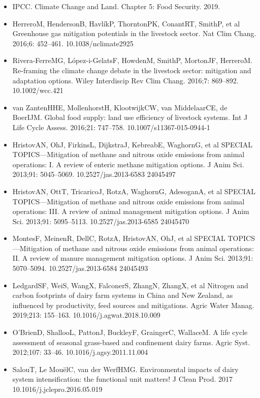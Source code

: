 \documentclass[11pt,a4paper]{article}
\begin{document}
\begin{itemize}
\item IPCC. Climate Change and Land. Chapter 5: Food Security. 2019.
\item HerreroM, HendersonB, HavlíkP, ThorntonPK, ConantRT, SmithP, et al Greenhouse gas mitigation potentials in the livestock sector. Nat Clim Chang. 2016;6: 452–461. 10.1038/nclimate2925
\item Rivera-FerreMG, López-i-GelatsF, HowdenM, SmithP, MortonJF, HerreroM. Re-framing the climate change debate in the livestock sector: mitigation and adaptation options. Wiley Interdiscip Rev Clim Chang. 2016;7: 869–892. 10.1002/wcc.421
\item van ZantenHHE, MollenhorstH, KlootwijkCW, van MiddelaarCE, de BoerIJM. Global food supply: land use efficiency of livestock systems. Int J Life Cycle Assess. 2016;21: 747–758. 10.1007/s11367-015-0944-1
\item HristovAN, OhJ, FirkinsL, DijkstraJ, KebreabE, WaghornG, et al SPECIAL TOPICS—Mitigation of methane and nitrous oxide emissions from animal operations: I. A review of enteric methane mitigation options. J Anim Sci. 2013;91: 5045–5069. 10.2527/jas.2013-6583 24045497
\item HristovAN, OttT, TricaricoJ, RotzA, WaghornG, AdesoganA, et al SPECIAL TOPICS—Mitigation of methane and nitrous oxide emissions from animal operations: III. A review of animal management mitigation options. J Anim Sci. 2013;91: 5095–5113. 10.2527/jas.2013-6585 24045470
\item MontesF, MeinenR, DellC, RotzA, HristovAN, OhJ, et al SPECIAL TOPICS—Mitigation of methane and nitrous oxide emissions from animal operations: II. A review of manure management mitigation options. J Anim Sci. 2013;91: 5070–5094. 10.2527/jas.2013-6584 24045493
\item LedgardSF, WeiS, WangX, FalconerS, ZhangN, ZhangX, et al Nitrogen and carbon footprints of dairy farm systems in China and New Zealand, as influenced by productivity, feed sources and mitigations. Agric Water Manag. 2019;213: 155–163. 10.1016/j.agwat.2018.10.009
\item O’BrienD, ShallooL, PattonJ, BuckleyF, GraingerC, WallaceM. A life cycle assessment of seasonal grass-based and confinement dairy farms. Agric Syst. 2012;107: 33–46. 10.1016/j.agsy.2011.11.004
\item SalouT, Le MouëlC, van der WerfHMG. Environmental impacts of dairy system intensification: the functional unit matters! J Clean Prod. 2017 10.1016/j.jclepro.2016.05.019

\end{itemize}
\end{document}
